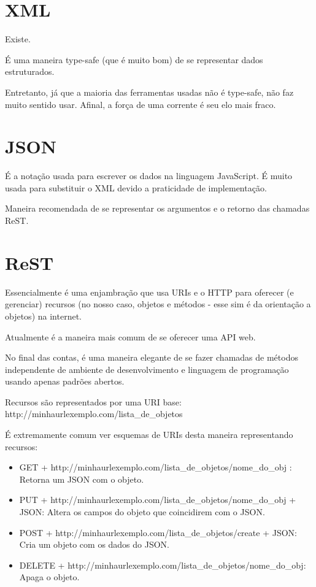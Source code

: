 \documentclass{book}
\begin{document}
\section{XML}

Existe. 

É uma maneira type-safe (que é muito bom) de se representar dados estruturados.

Entretanto,
já que a maioria das ferramentas usadas não é type-safe, 
não faz muito sentido usar. 
Afinal, a força de uma corrente é seu elo mais fraco.

\section{JSON}

É a notação usada para escrever os dados na linguagem JavaScript.
É muito usada para substituir o XML devido a praticidade de implementação.

Maneira recomendada de se representar os argumentos e o retorno das chamadas ReST.

\section{ReST}

Essencialmente é uma enjambração que usa URIs e o HTTP para oferecer (e gerenciar) 
recursos (no nosso caso, objetos e métodos - esse sim é da orientação a objetos) na internet.

Atualmente é a maneira mais comum de se oferecer uma API web.

No final das contas, é uma maneira elegante de se fazer 
chamadas de métodos independente de ambiente de desenvolvimento
e linguagem de programação usando apenas padrões abertos.

Recursos são representados por uma URI base: http://minhaurlexemplo.com/lista\_de\_objetos


É extremamente comum ver esquemas de URIs desta maneira representando recursos:

\begin{itemize}
\item GET + http://minhaurlexemplo.com/lista\_de\_objetos/nome\_do\_obj : Retorna um JSON com o objeto.
\item PUT + http://minhaurlexemplo.com/lista\_de\_objetos/nome\_do\_obj + JSON: Altera os campos do objeto que coincidirem com o JSON.
\item POST + http://minhaurlexemplo.com/lista\_de\_objetos/create + JSON: Cria um objeto com os dados do JSON.
\item DELETE + http://minhaurlexemplo.com/lista\_de\_objetos/nome\_do\_obj: Apaga o objeto.
\end{itemize}
\end{document}
